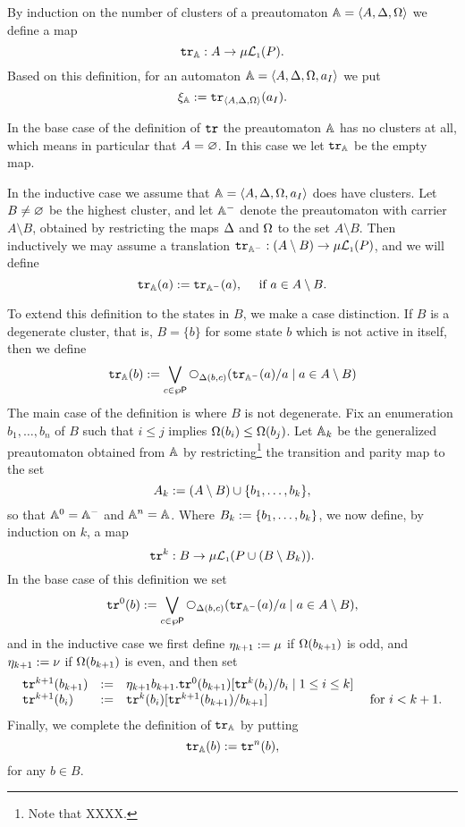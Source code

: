 \begin{definition}
\label{d:tr}
By induction on the number of clusters of a preautomaton $\mathbb{A} = \langle{A,\Delta,
\Omega}\rangle$ we define a map 
\[
\mathtt{tr}_{\mathbb{A}}: A \to \mu\mathcal{L}_{\scriptscriptstyle 1}(P).
\]
Based on this definition, for an automaton $\mathbb{A} = \langle{A,\Delta,\Omega, a_{I}}\rangle$ 
we put
\[
\xi_{\mathbb{A}} \mathrel{:=} \mathtt{tr}_{\langle{A,\Delta,\Omega}\rangle}(a_{I}).
\]

In the base case of the definition of $\mathtt{tr}$ the preautomaton $\mathbb{A}$ has no 
clusters at all, which means in particular that $A = \varnothing$.
In this case we let $\mathtt{tr}_{\mathbb{A}}$ be the empty map.

In the inductive case we assume that $\mathbb{A} = \langle{A,\Delta,\Omega, a_{I}}\rangle$ does 
have clusters. 
Let $B \neq \varnothing$ be the highest cluster, and let $\mathbb{A}^{-}$ denote the 
preautomaton with carrier $A \setminus B$, obtained by restricting the maps 
$\Delta$ and $\Omega$ to the set $A \setminus B$.
Then inductively we may assume a translation $\mathtt{tr}_{\mathbb{A}^{-}}: (A \setminus B)
\to \mu\mathcal{L}_{\scriptscriptstyle 1}(P)$, and we will define
\[
\ytr_{\bbA}(a) \isdef \ytr_{\bbA^{-}}(a), \quad\text{ if } a \in A \setminus B.
\]

To extend this definition to the states in $B$, we make a case 
distinction.
If $B$ is a degenerate cluster, that is, $B = \{ b \}$ for some state $b$ 
which is not active in itself, then we define
\[
\ytr_{\bbA}(b) \isdef
   \bigvee_{c \in \wp{\props}}
   \nxt{\tmap(b,c)}(\ytr_{\bbA^{-}}(a)/a \mid a \in A \setminus B)
\]
The main case of the definition is where $B$ is not degenerate.
Fix an enumeration $b_{1},\ldots,b_{n}$ of $B$ such that $i \leq j$ implies 
$\Omega(b_{i}) \leq \Omega(b_{j})$.
Let $\mathbb{A}_{k}$ be the generalized preautomaton obtained from $\mathbb{A}$ by 
restricting\footnote{Note that XXXX.
   }
the transition and parity map to the set
\[
A_{k} \mathrel{:=} (A\setminus B) \cup \{ b_{1},\ldots,b_{k} \},
\]
so that $\mathbb{A}^{0} = \mathbb{A}^{-}$ and $\mathbb{A}^{n} = \mathbb{A}$.
Where $B_{k} \mathrel{:=} \{ b_{1},\ldots,b_{k} \}$, we now define, by induction on 
$k$, a map 
\[
\mathtt{tr}^{k}: B \to \mu\mathcal{L}_{\scriptscriptstyle 1}(P \cup (B \setminus B_{k})).
\]
In the base case of this definition we set
\[
\ytr^{0}(b) \isdef 
   \bigvee_{c \in \wp{\props}} 
   \nxt{\tmap(b,c)}(\ytr_{\bbA^{-}}(a)/a \mid a \in A \setminus B),
\]
and in the inductive case we first define $\eta_{k+1} \mathrel{:=} \mu$ if
$\Omega(b_{k+1})$ is odd, and $\eta_{k+1} \mathrel{:=} \nu$ if $\Omega(b_{k+1})$ is 
even, and then set
\[\begin{array}{llll}
     \ytr^{k+1}(b_{k+1}) &\isdef &
   \eta_{k+1} b_{k+1}. \ytr^{0}(b_{k+1})[\ytr^{k}(b_{i})/b_{i} \mid 1 \leq i\leq k]
\\ \ytr^{k+1}(b_{i}) &\isdef &
   \ytr^{k}(b_{i})[\ytr^{k+1}(b_{k+1})/b_{k+1}]
   & \text{ for } i < k+1.
\end{array}\]
Finally, we complete the definition of $\mathtt{tr}_{\mathbb{A}}$ by putting
\[
\mathtt{tr}_{\mathbb{A}}(b) \mathrel{:=} \mathtt{tr}^{n}(b),
\]
for any $b \in B$.
\end{definition}

